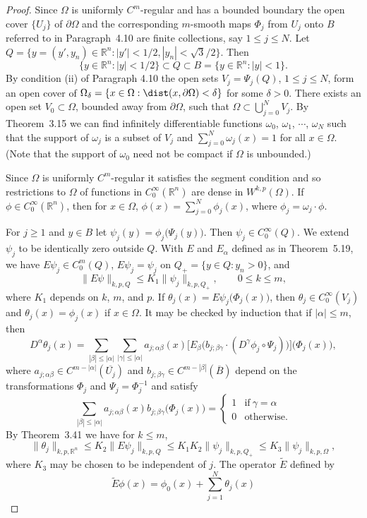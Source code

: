 \begin{proof}
  Since $\Omega$ is uniformly $C^m$-regular and has a bounded boundary
  the open cover $\{U_j\}$ of $\partial\Omega$ and the corresponding
  $m$-smooth maps $\Phi_j$ from $U_j$ onto $B$ referred to in Paragraph~4.10
  are finite collections, say $1\leq j\leq N$. Let
  $Q = \{y=(y',y_n)\in\mathbb{R}^n : |y'|<1/2, |y_n| < \sqrt3/2\}$. Then
  \[ \{y\in\mathbb{R}^n : |y|<1/2\} \subset Q \subset
      B = \{y\in\mathbb{R}^n : |y|<1\}. \]
  By condition (ii) of Paragraph 4.10 the open sets $V_j = \Psi_j(Q)$,
  $1\leq j\leq N$, form an open cover of $\Omega_{\delta} = \{x\in\Omega:
  \dist(x,\partial\Omega) < \delta\}$ for some $\delta>0$. There exists
  an open set $V_0\subset\Omega$, bounded away from $\partial\Omega$,
  such that $\Omega\subset\bigcup_{j=0}^N V_j$. By Theorem~3.15 we can
  find infinitely differentiable functions $\omega_0$, $\omega_1$, $\cdots$,
  $\omega_N$ such that the support of $\omega_j$ is a subset of $V_j$
  and $\sum_{j=0}^N \omega_j(x)=1$ for all $x\in\Omega$. (Note that the
  support of $\omega_0$ need not be compact if $\Omega$ is unbounded.)

  Since $\Omega$ is uniformly $C^m$-regular it satisfies the segment
  condition and so restrictions to $\Omega$ of functions in
  $C_0^\infty(\mathbb{R}^n)$ are dense in $W^{k,p}(\Omega)$.
  If $\phi\in C_0^\infty(\mathbb{R}^n)$, then for $x\in\Omega$,
  $\phi(x) = \sum_{j=0}^N \phi_j(x)$, where $\phi_j = \omega_j\cdot\phi$.

  For $j\geq 1$ and $y\in B$ let $\psi_j(y) = \phi_j\bigl(\Psi_j(y)\bigr)$.
  Then $\psi_j\in C_0^\infty(Q)$. We extend $\psi_j$ to be identically
  zero outside $Q$. With $E$ and $E_\alpha$ defined as in Theorem~5.19,
  we have $E\psi_j\in C_0^m(Q)$, $E\psi_j = \psi_j$ on $Q_+ = \{y\in Q: y_n>0\}$, and
  \[ \|E\psi\|_{k,p,Q} \leq K_1 \|\psi_j\|_{k,p,Q_+}, \qquad 0\leq k\leq m, \]
  where $K_1$ depends on $k$, $m$, and $p$. If $\theta_j(x) = E\psi_j\bigl(\Phi_j(x)\bigr)$,
  then $\theta_j \in C_0^\infty(V_j)$ and $\theta_j(x) = \phi_j(x)$ if $x\in\Omega$.
  It may be checked by induction that if $|\alpha|\leq m$, then
  \[ D^\alpha \theta_j(x) = \sum_{|\beta|\leq |\alpha|} \sum_{|\gamma|\leq |\alpha|}
      a_{j;\alpha\beta}(x) \bigl[E_{\beta} \bigl(b_{j;\beta\gamma} \cdot
      (D^\gamma \phi_j \circ \Psi_j)\bigr)\bigr] \bigl(\Phi_j(x)\bigr), \]
  where $a_{j;\alpha\beta} \in C^{m-|\alpha|} (\overline{U_j})$ and
  $b_{j;\beta\gamma} \in C^{m-|\beta|}(\overline{B})$ depend on the
  transformations $\Phi_j$ and $\Psi_j = \Phi_j^{-1}$ and satisfy
  \[ \sum_{|\beta|\leq |\alpha|} a_{j;\alpha\beta}(x)
      b_{j;\beta\gamma}\bigl(\Phi_j(x)\bigr)
      = \begin{cases}
        1 & \text{if}\ \gamma = \alpha \\
        0 & \text{otherwise}.
      \end{cases} \]
  By Theorem~3.41 we have for $k\leq m$,
  \[ \|\theta_j\|_{k,p,\mathbb{R}^n} \leq K_2 \|E\psi_j\|_{k,p,Q}
      \leq K_1K_2 \|\psi_j\|_{k,p,Q_+} \leq K_3 \|\psi_j\|_{k,p,\Omega}, \]
  where $K_3$ may be chosen to be independent of $j$. The operator $\tilde E$
  defined by
  \[ \tilde E \phi(x) = \phi_0(x) + \sum_{j=1}^N \theta_j(x) \]
\end{proof}